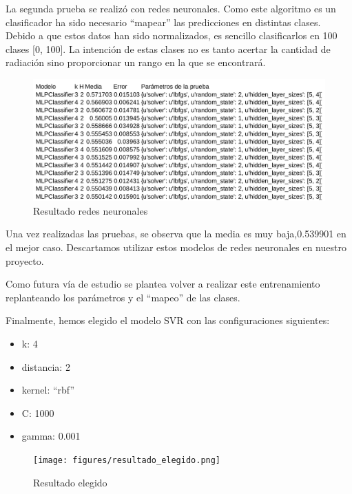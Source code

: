 La segunda prueba se realizó con redes neuronales. Como este algoritmo es un clasificador ha sido necesario ``mapear'' las predicciones en distintas clases. Debido a que estos datos han sido normalizados, es sencillo clasificarlos en 100 clases [0, 100]. La intención de estas clases no es tanto acertar la cantidad de radiación sino proporcionar un rango en la que se encontrará.

\begin{figure}[htb]
	\begin{center}
		\includegraphics[width=14cm]{figures/resultado_mlp.png}
		\caption{Resultado redes neuronales \label{resultado_mlp}}
	\end{center}
\end{figure}

Una vez realizadas las pruebas, se observa que la media es muy baja,0.539901 en el mejor caso. Descartamos utilizar estos modelos de redes neuronales en nuestro proyecto.

Como futura vía de estudio se plantea volver a realizar este entrenamiento replanteando los parámetros y el ``mapeo'' de las clases.

Finalmente, hemos elegido el modelo SVR con las configuraciones siguientes:

\begin{itemize}
	\item k: 4
	\item distancia: 2
	\item kernel: ``rbf''
	\item C: 1000
	\item gamma: 0.001
\end{itemize}

\begin{figure}[htb]
	\begin{center}
		\texttt{[image: figures/resultado\_elegido.png]}
		\caption{Resultado elegido \label{resultado_elegido}}
	\end{center}
\end{figure}

